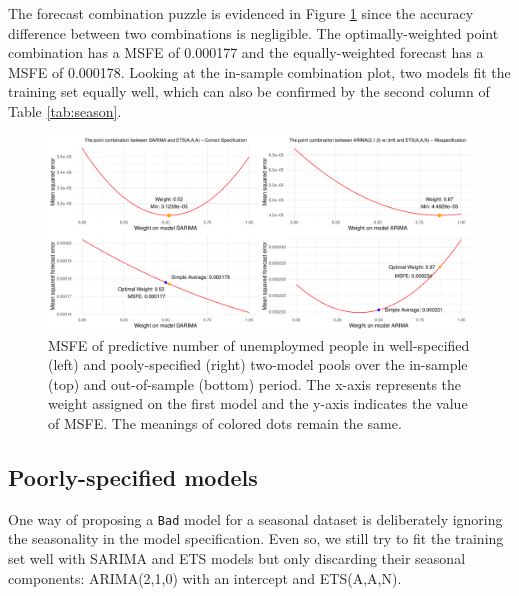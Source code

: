\documentclass{monashthesis}
\begin{document}
The forecast combination puzzle is evidenced in Figure \ref{fig:sd} since the accuracy difference between two combinations is negligible. The optimally-weighted point combination has a MSFE of 0.000177 and the equally-weighted forecast has a MSFE of 0.000178. Looking at the in-sample combination plot, two models fit the training set equally well, which can also be confirmed by the second column of Table \ref{tab:season}.

\begin{figure}[ht]
\centering
\includegraphics[scale=0.5]{figures/EMPL.pdf}
\caption{MSFE of predictive number of unemploymed people in well-specified (left) and pooly-specified (right) two-model pools over the in-sample (top) and out-of-sample (bottom) period. The x-axis represents the weight assigned on the first model and the y-axis indicates the value of MSFE. The meanings of colored dots remain the same.}
\label{fig:sd}
\end{figure}

\hypertarget{poorly-specified-models}{%
\subsection{Poorly-specified models}\label{poorly-specified-models}}

One way of proposing a \texttt{Bad} model for a seasonal dataset is deliberately ignoring the seasonality in the model specification. Even so, we still try to fit the training set well with SARIMA and ETS models but only discarding their seasonal components: ARIMA(2,1,0) with an intercept and ETS(A,A,N).
\end{document}

